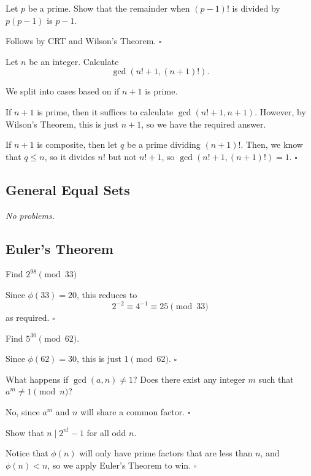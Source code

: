 \documentclass{article}
\newcommand{\noproblems}{\emph{No problems.}}
\begin{document}
\begin{problem}[2.8.2]{}
Let $p$ be a prime. Show that the remainder when $(p - 1)!$ is divided by $p(p - 1)$ is $p - 1$.
\end{problem}
Follows by CRT and Wilson's Theorem. $\square$

\begin{problem}[2.8.3]{}
Let $n$ be an integer. Calculate \[\gcd(n! + 1,(n + 1)!).\]
\end{problem}
We split into cases based on if $n+1$ is prime.

If $n+1$ is prime, then it suffices to calculate $\gcd(n!+1, n+1)$. However, by Wilson's Theorem, this is just $n+1$, so we have the required answer.

If $n+1$ is composite, then let $q$ be a prime dividing $(n+1)!$. Then, we know that $q \le n$, so it divides $n!$ but not $n!+1$, so $\gcd(n!+1,(n+1)!) = 1$. $\square$

\subsection{General Equal Sets}

\noproblems

\subsection{Euler's Theorem}

\begin{problem}[2.10.1]{}
Find $2^{98} \pmod{33}$
\end{problem}
Since $\phi(33) = 20$, this reduces to \[2^{-2} \equiv 4^{-1} \equiv 25 \pmod{33}\] as required. $\square$

\begin{problem}[2.10.2]{}
Find $5^{30} \pmod{62}$.
\end{problem}
Since $\phi(62) = 30$, this is just $1 \pmod{62}$. $\square$

\begin{problem}[2.10.3]{}
What happens if $\gcd(a, n) \neq 1$? Does there exist any integer $m$ such that $a^m \neq 1 \pmod{n}$?
\end{problem}
No, since $a^m$ and $n$ will share a common factor. $\square$

\begin{problem}[2.10.4]{}
Show that $n \mid 2^{n!} - 1$ for all odd $n$.
\end{problem}
Notice that $\phi(n)$ will only have prime factors that are less than $n$, and $\phi(n) < n$, so we apply Euler's Theorem to win. $\square$
\end{document}
